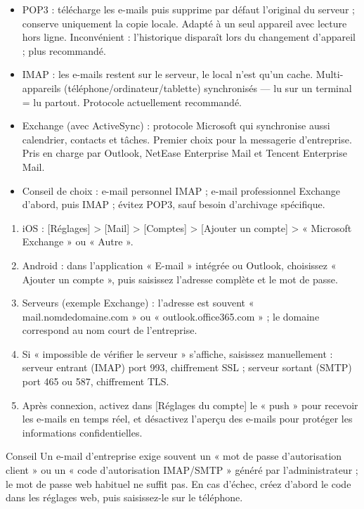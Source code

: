 \begin{itemize}
  \item POP3 : télécharge les e-mails puis supprime par défaut l'original du serveur ; conserve uniquement la copie locale. Adapté à un seul appareil avec lecture hors ligne. Inconvénient : l'historique disparaît lors du changement d'appareil ; plus recommandé.
  \item IMAP : les e-mails restent sur le serveur, le local n'est qu'un cache. Multi-appareils (téléphone/ordinateur/tablette) synchronisés — lu sur un terminal = lu partout. Protocole actuellement recommandé.
  \item Exchange (avec ActiveSync) : protocole Microsoft qui synchronise aussi calendrier, contacts et tâches. Premier choix pour la messagerie d'entreprise. Pris en charge par Outlook, NetEase Enterprise Mail et Tencent Enterprise Mail.
  \item Conseil de choix : e-mail personnel IMAP ; e-mail professionnel Exchange d'abord, puis IMAP ; évitez POP3, sauf besoin d'archivage spécifique.
\end{itemize}


\begin{enumerate}
  \item iOS : [Réglages] > [Mail] > [Comptes] > [Ajouter un compte] > « Microsoft Exchange » ou « Autre ».
  \item Android : dans l'application « E-mail » intégrée ou Outlook, choisissez « Ajouter un compte », puis saisissez l'adresse complète et le mot de passe.
  \item Serveurs (exemple Exchange) : l'adresse est souvent « mail.nomdedomaine.com » ou « outlook.office365.com » ; le domaine correspond au nom court de l'entreprise.
  \item Si « impossible de vérifier le serveur » s'affiche, saisissez manuellement : serveur entrant (IMAP) port 993, chiffrement SSL ; serveur sortant (SMTP) port 465 ou 587, chiffrement TLS.
  \item Après connexion, activez dans [Réglages du compte] le « push » pour recevoir les e-mails en temps réel, et désactivez l'aperçu des e-mails pour protéger les informations confidentielles.
\end{enumerate}

\begin{tcbinfo}{Conseil}
Un e-mail d'entreprise exige souvent un « mot de passe d'autorisation client » ou un « code d'autorisation IMAP/SMTP » généré par l'administrateur ; le mot de passe web habituel ne suffit pas. En cas d'échec, créez d'abord le code dans les réglages web, puis saisissez-le sur le téléphone.

\end{tcbinfo}

